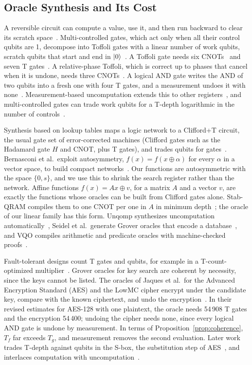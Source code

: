 \documentclass[journal]{IEEEtran}
\begin{document}
\subsection{Oracle Synthesis and Its Cost}

A reversible circuit can compute a value, use it, and then run backward to
clear its scratch space~\cite{bennett1973logical}. Multi-controlled gates, which
act only when all their control qubits are 1, decompose into Toffoli gates with
a linear number of work qubits, scratch qubits that start and end in
$\ket{0}$~\cite{barenco1995elementary}. A Toffoli gate needs six
CNOTs~\cite{shende2009cnot} and seven T gates~\cite{amy2013meet}. A
relative-phase Toffoli, which is correct up to phases that cancel when it is
undone, needs three CNOTs~\cite{maslov2016advantages}. A logical AND gate
writes the AND of two qubits into a fresh one with four T gates, and a
measurement undoes it with none~\cite{gidney2018halving}. Measurement-based
uncomputation extends this to other registers~\cite{luongo2025measurement}, and
multi-controlled gates can trade work qubits for a T-depth logarithmic in the
number of controls~\cite{dutta2025exact}.

Synthesis based on lookup tables maps
a logic network to a Clifford+T circuit, the usual gate set of error-corrected
machines (Clifford gates such as the Hadamard gate $H$ and CNOT, plus T gates),
and trades qubits for gates~\cite{soeken2019lut}. Bernasconi et al.\
exploit autosymmetry, $f(x)=f(x\oplus\alpha)$ for every $\alpha$ in a vector
space, to build compact networks~\cite{bernasconi2023xor}. Our functions are
autosymmetric with the space $\{0,s\}$, and we use this to shrink the search
register rather than the network. Affine functions $f(x)=Ax\oplus v$, for a
matrix $A$ and a vector $v$, are exactly the functions whose oracles can be
built from Clifford gates alone. Stab-QRAM
compiles them to one CNOT per one in $A$ in minimum depth~\cite{li2025stab}; the
oracle of our linear family has this form.
Unqomp synthesizes uncomputation
automatically~\cite{paradis2021unqomp}, Seidel et al.\ generate Grover oracles
that encode a database~\cite{seidel2023automatic}, and VQO compiles arithmetic
and predicate oracles with machine-checked proofs~\cite{li2022verified}.

Fault-tolerant designs count T gates and qubits, for example in a
T-count-optimized multiplier~\cite{munoz2019quantum}. Grover oracles for key
search are coherent by necessity, since the keys cannot be listed. The oracles of
Jaques et al.\ for the Advanced Encryption Standard (AES) and the LowMC cipher
encrypt under the candidate key, compare with the known ciphertext, and undo the
encryption~\cite{jaques2020implementing}. In their revised estimates for AES-128
with one plaintext, the oracle needs 54\,908 T gates and the encryption 54\,400;
undoing the cipher needs none, since every logical AND gate is undone by
measurement. In terms of Proposition~\ref{prop:coherence}, $T_f$ far exceeds
$T_g$, and measurement removes the second evaluation. Later work trades T-depth
against qubits in the S-box, the substitution step of
AES~\cite{chung2022alternative}, and interlaces computation with
uncomputation~\cite{zhang2024optimized}.
\end{document}
